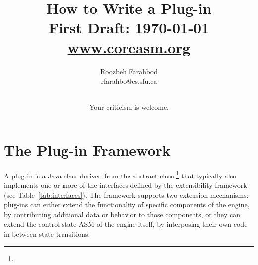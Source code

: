 \documentclass{article}
\newcommand{\version}{First Draft: \today}%
\begin{document}

\title{\huge How to Write a \CoreASM Plug-in \\ {\large \version} \\ {\large \url{www.coreasm.org}}}

\author{Roozbeh Farahbod \\ \ttfamily \small rfarahbo@cs.sfu.ca}

\date{ \\ {\small Your criticism is welcome.}}%


\maketitle

\tableofcontents 

\PScommands

\section{The \CoreASM Plug-in Framework}

A \CoreASM plug-in is a Java class derived from the abstract class \footnote{ 
} 
that typically also implements one or more of the interfaces defined by the 
\CoreASM extensibility framework (see
Table~\ref{tab:interfaces}). The framework supports two extension
mechanisms: plug-ins can either extend the functionality of specific
components of the engine, by contributing additional data or behavior
to those components, or they can extend the control state ASM of the
engine itself, by interposing their own code in between state transitions.
\end{document}
